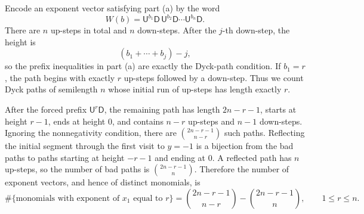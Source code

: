 \documentclass[11pt]{article}
\newcommand{\U}{\mathsf{U}}
\newcommand{\D}{\mathsf{D}}
\begin{document}
Encode an exponent vector satisfying part (a) by the word
\[
    W(b)=\U^{b_1}\D\,\U^{b_2}\D\cdots
          \U^{b_n}\D.
\]
There are \(n\) up-steps in total and \(n\) down-steps. After the \(j\)-th
down-step, the height is
\[
    (b_1+\cdots+b_j)-j,
\]
so the prefix inequalities in part (a) are exactly the Dyck-path condition.
If \(b_1=r\), the path begins with exactly \(r\) up-steps followed by a
down-step. Thus we count Dyck paths of semilength \(n\) whose initial run of
up-steps has length exactly \(r\).

After the forced prefix \(\U^r\D\), the remaining path has length
\(2n-r-1\), starts at height \(r-1\), ends at height \(0\), and contains
\(n-r\) up-steps and \(n-1\) down-steps. Ignoring the nonnegativity
condition, there are
\(\binom{2n-r-1}{n-r}\) such paths. Reflecting the initial segment through
the first visit to \(y=-1\) is a bijection from the bad paths to paths
starting at height \(-r-1\) and ending at \(0\). A reflected path has \(n\)
up-steps, so the number of bad paths is
\(\binom{2n-r-1}{n}\). Therefore the number of exponent vectors, and hence of
distinct monomials, is
\[
\boxed{
\#\{\text{monomials with exponent of }x_1\text{ equal to }r\}
 =\binom{2n-r-1}{n-r}-\binom{2n-r-1}{n},
\qquad 1\leq r\leq n.
}
\]
\end{document}
